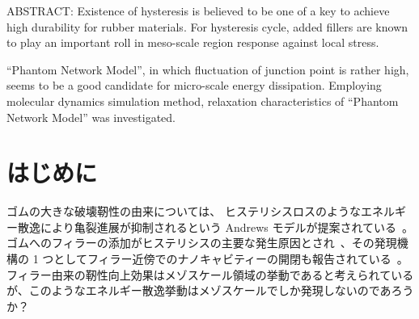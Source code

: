 \documentclass[uplatex,10pt,a4paper,twocolumn]{jsarticle}
\begin{document}


\begin{spacing}{0.95}
ABSTRACT: 
Existence of hysteresis is believed to be one of a key to achieve high durability for rubber materials.
For hysteresis cycle, added fillers are known to play an important roll in meso-scale region response against local stress.

``Phantom Network Model'', in which fluctuation of junction point is rather high, seems to be a good candidate for micro-scale energy dissipation.
Employing molecular dynamics simulation method, relaxation characteristics of ``Phantom Network Model'' was investigated.
\end{spacing}

\section{はじめに}

ゴムの大きな破壊靭性の由来については、 ヒステリシスロスのようなエネルギー散逸により亀裂進展が抑制されるという Andrews モデルが提案されている~\cite{Andrews1977}。
ゴムへのフィラーの添加がヒステリシスの主要な発生原因とされ~\cite{Grosch1968}、その発現機構の 1 つとしてフィラー近傍でのナノキャビティーの開閉も報告されている~\cite{Zhang2013}。
フィラー由来の靭性向上効果はメゾスケール領域の挙動であると考えられているが、このようなエネルギー散逸挙動はメゾスケールでしか発現しないのであろうか？
\end{document}

